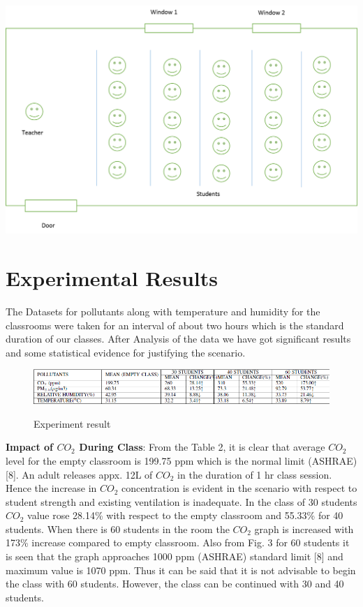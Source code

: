 \includegraphics[width=1.0\textwidth]{./class}\\[0.1in]
\label{Classroom monitoring}

\section{Experimental Results}
The Datasets for pollutants along with temperature and humidity for the classrooms were taken for an interval of about two hours which is the standard duration of our classes. After Analysis of the data we have got significant results and some statistical evidence for justifying the scenario.
\begin{figure}
\centering
\includegraphics[scale=0.5]{./table}\\[0.1in]
\label{fig:Experimental result}
\caption{Experiment result}
\end{figure}


\textbf{Impact of $CO_2$ During Class}: From the Table 2, it is clear that average $CO_2$ level for the empty classroom is 199.75 ppm which is the normal limit (ASHRAE) [8]. An adult releases appx. 12L of $CO_2$ in the duration of 1 hr class session. Hence the increase in $CO_2$ concentration is evident in the scenario with respect to student strength and existing ventilation is inadequate. In the class of 30 students $CO_2$ value rose 28.14\% with respect to the empty classroom and 55.33\% for 40 students. When there is 60 students in the room the $CO_2$ graph is increased with 173\% increase compared to empty classroom. Also from Fig. 3 for 60 students it is seen that the graph approaches 1000 ppm (ASHRAE) standard limit [8] and maximum value is 1070 ppm. Thus it can be said that it is not advisable to begin the class with 60 students. However, the class can be continued with 30 and 40 students.


